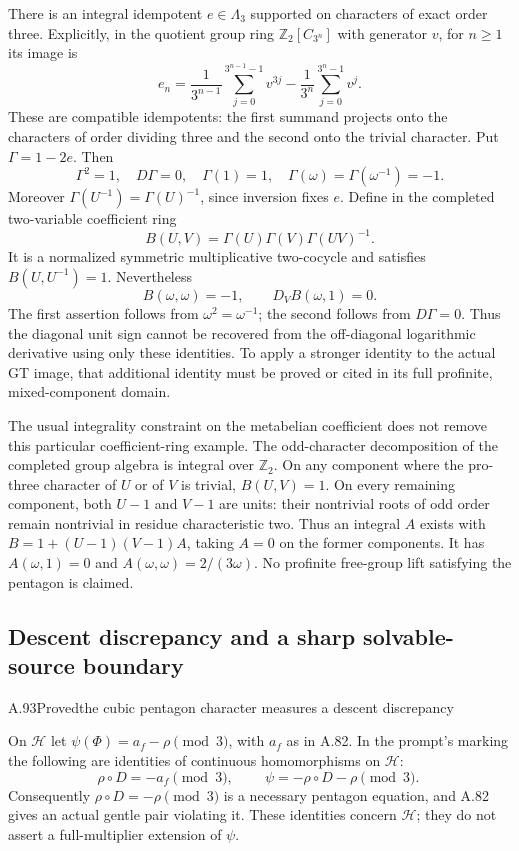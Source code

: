 There is an integral idempotent $e\in\Lambda_3$ supported on
characters of exact order three.  Explicitly, in the quotient
group ring $\mathbb Z_2[C_{3^n}]$ with generator $v$, for $n\geq1$
its image is
\[
 e_n=\frac1{3^{n-1}}\sum_{j=0}^{3^{n-1}-1}v^{3j}
       -\frac1{3^n}\sum_{j=0}^{3^n-1}v^j.
\]
These are compatible idempotents: the first summand projects
onto the characters of order dividing three and the second onto
the trivial character.  Put $\Gamma=1-2e$.  Then
\[
 \Gamma^2=1,\quad D\Gamma=0,\quad \Gamma(1)=1,
 \quad \Gamma(\omega)=\Gamma(\omega^{-1})=-1.
\]
Moreover $\Gamma(U^{-1})=\Gamma(U)^{-1}$, since inversion fixes
$e$.  Define in the completed two-variable coefficient ring
\[
 B(U,V)=\Gamma(U)\Gamma(V)\Gamma(UV)^{-1}.
\]
It is a normalized symmetric multiplicative two-cocycle and
satisfies $B(U,U^{-1})=1$.  Nevertheless
\[
 B(\omega,\omega)=-1,
 \qquad D_VB(\omega,1)=0.
\]
The first assertion follows from $\omega^2=\omega^{-1}$;
the second follows from $D\Gamma=0$.  Thus the diagonal unit
sign cannot be recovered from the off-diagonal logarithmic
derivative using only these identities.  To apply a stronger
identity to the actual GT image, that additional identity must
be proved or cited in its full profinite, mixed-component domain.

The usual integrality constraint on the metabelian coefficient
does not remove this particular coefficient-ring example.
The odd-character decomposition of the completed group algebra
is integral over $\mathbb Z_2$.  On any component where the
pro-three character of $U$ or of $V$ is trivial, $B(U,V)=1$.
On every remaining component, both $U-1$ and $V-1$ are units:
their nontrivial roots of odd order remain nontrivial in residue
characteristic two.  Thus an integral $A$ exists with
$B=1+(U-1)(V-1)A$, taking $A=0$ on the former components.
It has $A(\omega,1)=0$ and
$A(\omega,\omega)=2/(3\omega)$.
No profinite free-group lift satisfying the pentagon is claimed.

\subsection{Descent discrepancy and a sharp solvable-source boundary}


\begin{statement}{A.93}{Proved}{the cubic pentagon character measures a descent discrepancy}
\end{statement}
On $\mathcal H$ let $\psi(\Phi)=a_f-\rho\pmod3$, with
$a_f$ as in A.82. In the prompt's marking the following are
identities of continuous homomorphisms on $\mathcal H$:
\[
 \rho\circ D=-a_f\pmod3,
 \qquad
 \boxed{\ \psi=-\rho\circ D-\rho\pmod3.\ }
\]
Consequently $\rho\circ D=-\rho\pmod3$ is a necessary
pentagon equation, and A.82 gives an actual gentle pair violating
it. These identities concern $\mathcal H$; they do not assert
a full-multiplier extension of $\psi$.

